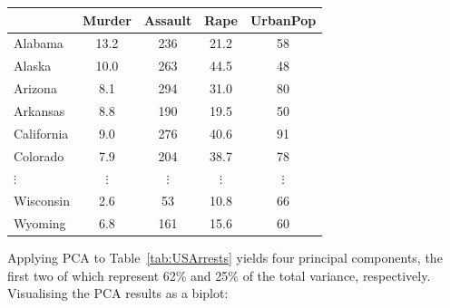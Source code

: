 \begingroup
\noindent\begin{minipage}[t][][b]{.55\textwidth}
\begin{tabular}{l|c@{~~}c@{~~}c@{~~}c@{~}}
      & Murder & Assault & Rape & UrbanPop \\ \hline
Alabama    &  13.2  & 236  & 21.2 & 58 \\
Alaska     &  10.0  & 263  & 44.5 & 48 \\
Arizona    &   8.1  & 294  & 31.0 & 80 \\
Arkansas    &  8.8  & 190  & 19.5 & 50 \\
California  &  9.0  & 276  & 40.6 & 91 \\
Colorado    &  7.9  & 204  & 38.7 & 78 \\
$\vdots$ & $\vdots$ & $\vdots$ & $\vdots$ & $\vdots$ \\
Wisconsin  & 2.6 & 53  & 10.8 & 66 \\
Wyoming    & 6.8 & 161 & 15.6 & 60 
\end{tabular}
\end{minipage}
\begin{minipage}[t][][t]{.45\textwidth}
  \label{tab:USArrests}
\end{minipage}
\endgroup\medskip

Applying PCA to Table~\ref{tab:USArrests} yields four principal
components, the first two of which represent 62\% and 25\% of the
total variance, respectively.  Visualising the PCA results as a
biplot:

